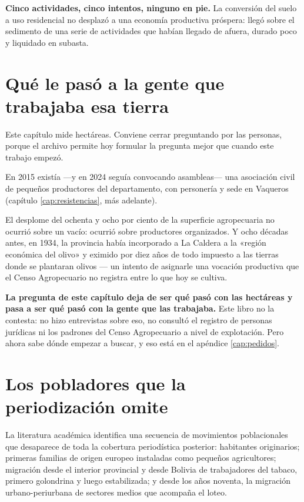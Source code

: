 \textbf{Cinco actividades, cinco intentos, ninguno en pie.} La conversión del suelo a uso
residencial no desplazó a una economía productiva próspera: llegó sobre el sedimento de una
serie de actividades que habían llegado de afuera, durado poco y liquidado en subasta.

\section{Qué le pasó a la gente que trabajaba esa tierra}

Este capítulo mide hectáreas. Conviene cerrar preguntando por las personas, porque el
archivo permite hoy formular la pregunta mejor que cuando este trabajo empezó.

En 2015 existía ---y en 2024 seguía convocando asambleas--- una asociación civil de pequeños productores del departamento, con personería y sede en Vaqueros (capítulo \ref{cap:resistencias}, más adelante).

El desplome del ochenta y ocho por ciento de la superficie agropecuaria no ocurrió sobre un
vacío: ocurrió sobre productores organizados. Y ocho décadas antes, en 1934, la provincia
había incorporado a La Caldera a la «región económica del olivo» y eximido por diez años de
todo impuesto a las tierras donde se plantaran olivos --- un intento de asignarle una
vocación productiva que el Censo Agropecuario no registra entre lo que hoy se cultiva.

\textbf{La pregunta de este capítulo deja de ser qué pasó con las hectáreas y pasa a ser qué
pasó con la gente que las trabajaba.} Este libro no la contesta: no hizo entrevistas sobre eso, no
consultó el registro de personas jurídicas ni los padrones del Censo Agropecuario a nivel de
explotación. Pero ahora sabe dónde empezar a buscar, y eso está en el apéndice \ref{cap:pedidos}.

\section{Los pobladores que la periodización omite}

La literatura académica identifica una secuencia de movimientos poblacionales que desaparece de toda la cobertura periodística posterior: habitantes originarios; primeras familias de origen europeo instaladas como pequeños agricultores; migración desde el interior provincial y desde Bolivia de trabajadores del tabaco, primero golondrina y luego estabilizada; y desde los años noventa, la migración urbano-periurbana de sectores medios que acompaña el loteo.

